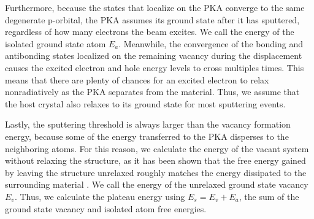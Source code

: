 \documentclass{article}
\begin{document}
Furthermore, because the states that localize on the PKA converge to the same
degenerate p-orbital, the PKA assumes its ground state after it has sputtered,
regardless of how many electrons the beam excites.
We call the energy of the isolated ground state atom $E_a$.
Meanwhile, the convergence of the bonding and antibonding states localized on
the remaining vacancy during the displacement causes the excited electron and
hole energy levels to cross multiples times.  This means that there are plenty
of chances for an excited electron to relax nonradiatively as the PKA separates
from the material.  Thus, we assume that the host crystal also relaxes to its
ground state for most sputtering events.

Lastly, the sputtering threshold is always larger than the vacancy formation
energy, because some of the energy transferred to the PKA disperses to the
neighboring atoms.
For this reason, we calculate the energy of the vacant system without relaxing
the structure, as it has been shown that the free energy gained by leaving the
structure unrelaxed roughly matches the energy dissipated to the
surrounding material \cite{Komsa2012}.
We call the energy of the unrelaxed ground state vacancy $E_v$.
Thus, we calculate the plateau energy using $E_s = E_v + E_a$, the sum of the
ground state vacancy and isolated atom free energies.
\end{document}
